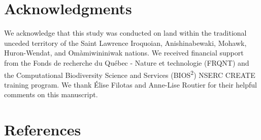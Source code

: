 \documentclass[11pt]{article}
\begin{document}
\hypertarget{acknowledgments}{%
\section{Acknowledgments}\label{acknowledgments}}

We acknowledge that this study was conducted on land within the
traditional unceded territory of the Saint Lawrence Iroquoian,
Anishinabewaki, Mohawk, Huron-Wendat, and Omàmiwininiwak nations. We
received financial support from the Fonds de recherche du Québec -
Nature et technologie (FRQNT) and the Computational Biodiversity Science
and Services (BIOS\textsuperscript{2}) NSERC CREATE training program. We
thank Élise Filotas and Anne-Lise Routier for their helpful comments on
this manuscript.

\hypertarget{references}{%
\section*{References}\label{references}}
\end{document}
